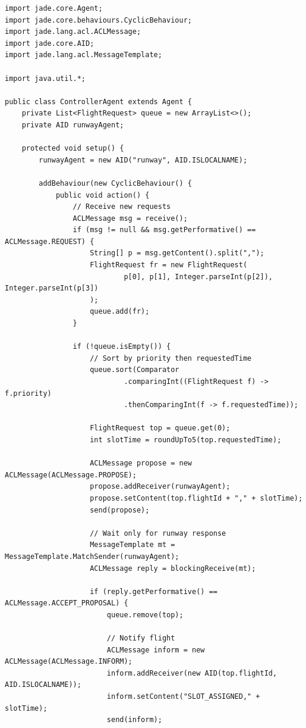 \documentclass[12pt,a4paper]{article}
\begin{document}
\begin{lstlisting}[caption=ControllerAgent.java]
import jade.core.Agent;
import jade.core.behaviours.CyclicBehaviour;
import jade.lang.acl.ACLMessage;
import jade.core.AID;
import jade.lang.acl.MessageTemplate;

import java.util.*;

public class ControllerAgent extends Agent {
    private List<FlightRequest> queue = new ArrayList<>();
    private AID runwayAgent;

    protected void setup() {
        runwayAgent = new AID("runway", AID.ISLOCALNAME);

        addBehaviour(new CyclicBehaviour() {
            public void action() {
                // Receive new requests
                ACLMessage msg = receive();
                if (msg != null && msg.getPerformative() == ACLMessage.REQUEST) {
                    String[] p = msg.getContent().split(",");
                    FlightRequest fr = new FlightRequest(
                            p[0], p[1], Integer.parseInt(p[2]), Integer.parseInt(p[3])
                    );
                    queue.add(fr);
                }

                if (!queue.isEmpty()) {
                    // Sort by priority then requestedTime
                    queue.sort(Comparator
                            .comparingInt((FlightRequest f) -> f.priority)
                            .thenComparingInt(f -> f.requestedTime));

                    FlightRequest top = queue.get(0);
                    int slotTime = roundUpTo5(top.requestedTime);

                    ACLMessage propose = new ACLMessage(ACLMessage.PROPOSE);
                    propose.addReceiver(runwayAgent);
                    propose.setContent(top.flightId + "," + slotTime);
                    send(propose);

                    // Wait only for runway response
                    MessageTemplate mt = MessageTemplate.MatchSender(runwayAgent);
                    ACLMessage reply = blockingReceive(mt);

                    if (reply.getPerformative() == ACLMessage.ACCEPT_PROPOSAL) {
                        queue.remove(top);

                        // Notify flight
                        ACLMessage inform = new ACLMessage(ACLMessage.INFORM);
                        inform.addReceiver(new AID(top.flightId, AID.ISLOCALNAME));
                        inform.setContent("SLOT_ASSIGNED," + slotTime);
                        send(inform);


\end{lstlisting}
\end{document}
